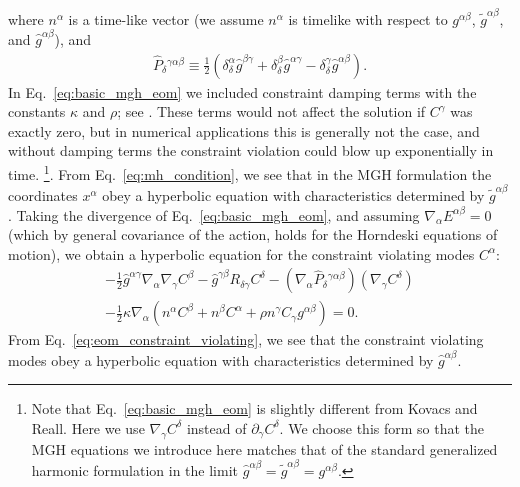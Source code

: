 \documentclass{ws-ijmpd}
\begin{document}
where $n^{\alpha}$ is a time-like vector 
(we assume $n^{\alpha}$ is timelike with respect to $g^{\alpha\beta}$,
$\tilde{g}^{\alpha\beta}$, and 
$\hat{g}^{\alpha\beta}$), and
\begin{align}
   \hat{P}_{\delta}{}^{\gamma\alpha\beta}
   \equiv
   \frac{1}{2}\left(
      \delta_{\delta}^{\alpha}\hat{g}^{\beta\gamma}
      +	
      \delta_{\delta}^{\beta}\hat{g}^{\alpha\gamma}
      -	
      \delta_{\delta}^{\gamma}\hat{g}^{\alpha\beta}
   \right)
   .
\end{align}
In Eq.~\eqref{eq:basic_mgh_eom}
we included constraint damping terms with the constants 
$\kappa$ and $\rho$; see . 
These terms would not affect the solution if $C^{\gamma}$ was
exactly zero,
but in numerical applications this is generally not the case, 
and without damping terms
the constraint violation could blow up exponentially in 
time\cite{Pretorius:2004jg,Pretorius:2005gq,Pretorius:2006tp,East:2020hgw}.
\footnote{Note that Eq.~\eqref{eq:basic_mgh_eom} is slightly different
from Kovacs and Reall\cite{Kovacs:2020ywu}. Here we use 
$\nabla_{\gamma}C^{\delta}$ instead of
$\partial_{\gamma}C^{\delta}$.
We choose this form so that the MGH equations we introduce
here matches that of
the standard generalized harmonic formulation\cite{East:2020hgw}
in the limit 
$\hat{g}^{\alpha\beta}=\tilde{g}^{\alpha\beta}=g^{\alpha\beta}$.
}.
From Eq.~\eqref{eq:mh_condition},
we see that in the MGH formulation the coordinates
$x^{\alpha}$ obey a hyperbolic equation with characteristics determined by
$\tilde{g}^{\alpha\beta}$. Taking the divergence of 
Eq.~\eqref{eq:basic_mgh_eom},
and assuming 
$\nabla_{\alpha}E^{\alpha\beta}=0$ (which by general covariance 
of the action, holds for the Horndeski equations of motion),
we obtain a hyperbolic equation
for the constraint violating modes $C^{\alpha}$: 
\begin{align}
\label{eq:eom_constraint_violating}
   -  
   \frac{1}{2}\hat{g}^{\alpha\gamma}
   \nabla_{\alpha}\nabla_{\gamma}C^{\beta}
   -  
   \hat{g}^{\gamma\beta}R_{\delta\gamma}C^{\delta}
   -  
   \left(
      \nabla_{\alpha}\hat{P}_{\delta}{}^{\gamma\alpha\beta}
   \right)
   \left(
      \nabla_{\gamma}C^{\delta}
   \right)
   \nonumber \\
   -  
   \frac{1}{2}\kappa\nabla_{\alpha}\left(
      n^{\alpha}C^{\beta}
      +  
      n^{\beta}C^{\alpha}
      +  
      \rho n^{\gamma}C_{\gamma} g^{\alpha\beta}
   \right)
   =
   0
   .
\end{align}
From Eq.~\eqref{eq:eom_constraint_violating},
we see that the constraint violating modes 
obey a hyperbolic equation with characteristics determined
by $\hat{g}^{\alpha\beta}$.
\end{document}
